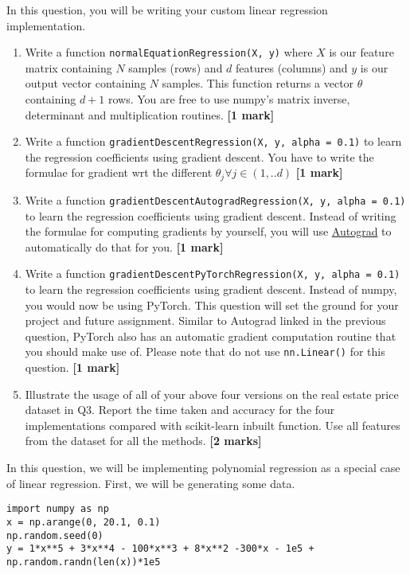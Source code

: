 \documentclass[colorlinks,linkcolor=true]{article}
\begin{document}
\item In this question, you will be writing your custom linear regression implementation. 
\begin{enumerate}
	\item Write a function \texttt{normalEquationRegression(X, y)} where $X$ is our feature matrix containing $N$ samples (rows) and $d$ features (columns) and $y$ is our output vector containing $N$ samples. This function returns a vector $\theta$ containing $d+1$ rows. You are free to use numpy's matrix inverse, determinant and multiplication routines. \textbf{[1 mark]}
	\item Write a function \texttt{gradientDescentRegression(X, y, alpha = 0.1)} to learn the regression coefficients using gradient descent. You have to write the formulae for gradient wrt the different $\theta_j \forall j \in (1, ..d)$ \textbf{[1 mark]}
	\item Write a function \texttt{gradientDescentAutogradRegression(X, y, alpha = 0.1)} to learn the regression coefficients using gradient descent. Instead of writing the formulae for computing gradients by yourself, you will use \href{https://github.com/HIPS/autograd}{Autograd} to automatically do that for you. \textbf{[1 mark]}
	\item Write a function \texttt{gradientDescentPyTorchRegression(X, y, alpha = 0.1)} to learn the regression coefficients using gradient descent. Instead of numpy, you would now be using PyTorch. This question will set the ground for your project and future assignment. Similar to Autograd linked in the previous question, PyTorch also has an automatic gradient computation routine that you should make use of. Please note that do not use \texttt{nn.Linear()} for this question. \textbf{[1 mark]}
	\item Illustrate the usage of all of your above four versions on the real estate price dataset in Q3. Report the time taken and accuracy for the four implementations compared with scikit-learn inbuilt function. Use all features from the dataset for all the methods. \textbf{[2 marks]}
\end{enumerate}

\item In this question, we will be implementing polynomial regression as a special case of linear regression. First, we will be generating some data. 

\begin{verbatim}
import numpy as np
x = np.arange(0, 20.1, 0.1)
np.random.seed(0)
y = 1*x**5 + 3*x**4 - 100*x**3 + 8*x**2 -300*x - 1e5 + np.random.randn(len(x))*1e5
\end{verbatim}
\end{document}
